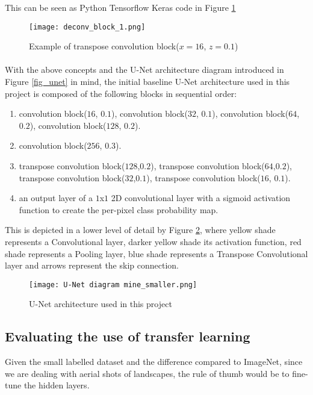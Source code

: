 This can be seen as Python Tensorflow Keras code in Figure \ref{deconv_block_1}
\begin{figure}[hbt!]
    \centering
    \texttt{[image: deconv\_block\_1.png]}
    \caption{Example of transpose convolution block($x=16$, $z=0.1$)}
    \label{deconv_block_1}
\end{figure}
\paragraph{}
With the above concepts and the U-Net architecture diagram introduced in Figure \ref{fig_unet} in mind, the initial baseline U-Net architecture used in this project is composed of the following blocks in sequential order:

    \begin{enumerate}
        \item convolution block($16$, $0.1$), convolution block($32$, $0.1$), convolution block($64$, $0.2$), convolution block($128$, $0.2$).
        \item convolution block($256$, $0.3$).
        \item transpose convolution block($128$,$0.2$), transpose convolution block($64$,$0.2$), transpose convolution block($32$,$ 0.1$), transpose convolution block($16$, $0.1$).
        \item an output layer of a $1$x$1$ 2D convolutional layer with a sigmoid activation function to create the per-pixel class probability map.
    \end{enumerate}

This is depicted in a lower level of detail by Figure \ref{unet_mine}, where yellow shade represents a Convolutional layer, darker yellow shade its activation function, red shade represents a Pooling layer, blue shade represents a Transpose Convolutional layer and arrows represent the skip connection.

\begin{figure}[hbt!]
    \centering
    \texttt{[image: U-Net diagram mine\_smaller.png]}
    \caption{U-Net architecture used in this project}
    \label{unet_mine}
\end{figure}

\subsection{Evaluating the use of transfer learning}
Given the small labelled dataset and the difference compared to ImageNet, since we are dealing with aerial shots of landscapes, the rule of thumb would be to fine-tune the hidden layers.
